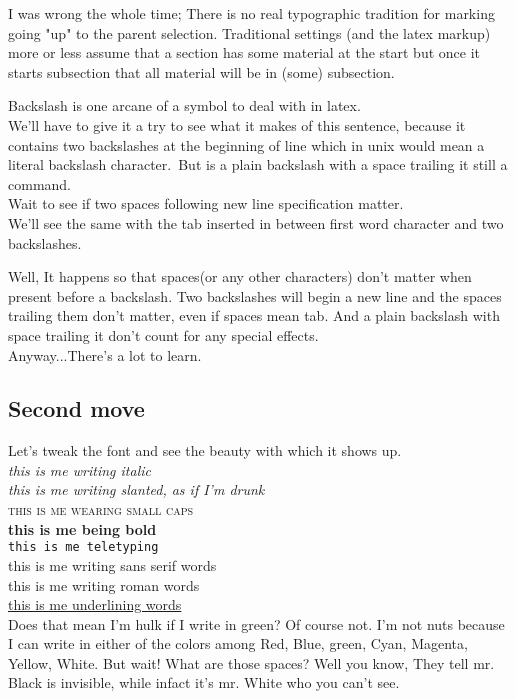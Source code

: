 \documentclass[a4paper,12pt]{article}
\begin{document}
I was wrong the whole time; There is no real typographic tradition for marking going "up" to the parent selection. Traditional settings (and the latex markup) more or less assume that a section has some material at the start but once it starts subsection that all material will be in (some) subsection.

Backslash is one arcane of a symbol to deal with in latex.\\ We'll have to give it a try to see what it makes of this sentence, because it contains two backslashes at the beginning of line which in unix would mean a literal backslash character.\ But is a plain backslash with a space trailing it still a command. \\  Wait to see if two spaces following new line specification matter. \\	We'll see the same with the tab inserted in between first word character and two backslashes.

Well, It happens so that spaces(or any other characters) don't matter when present before a backslash. Two backslashes will begin a new line and the spaces trailing them don't matter, even if spaces mean tab. And a plain backslash with space trailing it don't count for any special effects.\\

Anyway...There's a lot to learn.

\subsection{Second move}
\label{second-method}

Let's tweak the font and see the beauty with which it shows up. \\
\textit{this is me writing italic} \\
\textsl{this is me writing slanted, as if I'm drunk} \\
\textsc{this is me wearing small caps} \\
\textbf{this is me being bold} \\
\texttt{this is me teletyping} \\
\textsf{this is me writing sans serif words} \\
\textrm{this is me writing roman words} \\
\underline{this is me underlining words} \\

{\color{green}Does that mean I'm hulk if I write in green? Of course not. I'm not {\color{red}nuts} because I can write in either of the colors among {\color{red}Red}, {\color{blue}Blue}, {\color{green}green}, {\color{cyan}Cyan}, {\color{magenta}Magenta}, {\color{yellow}Yellow}, {\color{white}White}. But wait! What are those spaces? Well you know, They tell mr. Black is invisible, while infact it's mr. White who you can't see.}
\end{document}
